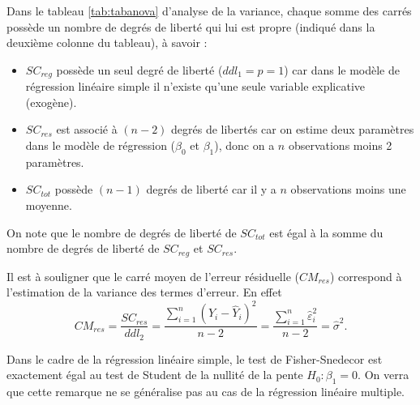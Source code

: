
\vspace{0.05in}
\begin{remarque}
Dans le tableau \ref{tab:tabanova} d'analyse de la variance, chaque somme des carrés possède un nombre de degrés de liberté qui lui est propre (indiqué dans la deuxième colonne du tableau), à savoir :
\begin{itemize}
\item[$\bullet$] $SC_{reg}$ possède un seul degré de liberté ($ddl_1=p=1$) car dans le modèle de régression linéaire simple il n'existe qu'une seule variable explicative (exogène).
\item[$\bullet$] $SC_{res}$ est associé à $(n-2)$ degrés de libertés car on estime deux paramètres dans le modèle de régression ($\beta_0$ et $\beta_1$), donc on a $n$ observations moins 2 paramètres.
\item[$\bullet$] $SC_{tot}$ possède $(n-1)$ degrés de liberté car il y a $n$ observations moins une moyenne.
\end{itemize}
On note que le nombre de degrés de liberté de $SC_{tot}$ est égal à la somme du nombre de degrés de liberté de $SC_{reg}$ et $SC_{res}$.
\end{remarque}


\begin{remarque}
Il est à souligner que le carré moyen de l'erreur résiduelle ($CM_{res}$) correspond à l'estimation de la variance des termes d'erreur. En effet
 \[CM_{res}=\frac{SC_{res}}{ddl_2}= \frac{\sum_{i=1}^n (Y_i-\hat{Y}_i)^2}{n-2}=\frac{\sum_{i=1}^n \hat\varepsilon_i^2}{n-2}=\hat\sigma^2.
\]
\end{remarque}

\vspace{0.05 in}
\begin{remarque}
Dans le cadre de la régression linéaire simple, le test de Fisher-Snedecor est exactement égal au test de Student de la nullité de la pente $H_0: \beta_1=0$. On verra que cette remarque ne se généralise pas au cas de la régression linéaire multiple.
\end{remarque}

